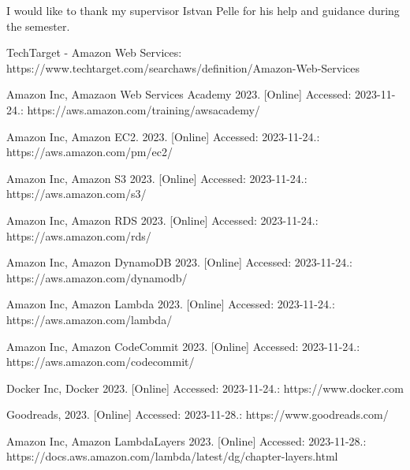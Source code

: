 \documentclass[11pt,a4paper,oneside]{report}
\begin{document}
I would like to thank my supervisor Istvan Pelle for his help and guidance during the semester.


\begin{thebibliography}{9}
  TechTarget - Amazon Web Services: https://www.techtarget.com/searchaws/definition/Amazon-Web-Services

  Amazon Inc, Amazaon Web Services Academy 2023. [Online] Accessed: 2023-11-24.: https://aws.amazon.com/training/awsacademy/

  Amazon Inc, Amazon EC2. 2023. [Online] Accessed: 2023-11-24.: https://aws.amazon.com/pm/ec2/

  Amazon Inc, Amazon S3 2023. [Online] Accessed: 2023-11-24.: https://aws.amazon.com/s3/

  Amazon Inc, Amazon RDS 2023. [Online] Accessed: 2023-11-24.: https://aws.amazon.com/rds/

  Amazon Inc, Amazon DynamoDB 2023. [Online] Accessed: 2023-11-24.: https://aws.amazon.com/dynamodb/

  Amazon Inc, Amazon Lambda 2023. [Online] Accessed: 2023-11-24.: https://aws.amazon.com/lambda/

  Amazon Inc, Amazon CodeCommit 2023. [Online] Accessed: 2023-11-24.: https://aws.amazon.com/codecommit/

  Docker Inc, Docker 2023. [Online] Accessed: 2023-11-24.: https://www.docker.com

  Goodreads, 2023. [Online] Accessed: 2023-11-28.: https://www.goodreads.com/

  Amazon Inc, Amazon LambdaLayers 2023. [Online] Accessed: 2023-11-28.: https://docs.aws.amazon.com/lambda/latest/dg/chapter-layers.html


\end{thebibliography}
\end{document}
